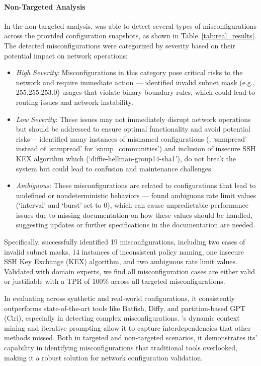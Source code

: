 \paragraph{Non-Targeted Analysis}
In the non-targeted analysis, \sysname{} was able to detect several types of misconfigurations across the provided configuration snapshots, as shown in Table~\ref{tab:real_results}.
The detected misconfigurations were categorized by severity based on their potential impact on network operations:
\begin{itemize}
    \item \textit{High Severity}: Misconfigurations in this category pose critical risks to the network and require immediate action --- \sysname{} identified invalid subnet mask (e.g., 255.255.253.0) usages that violate binary boundary rules, which could lead to routing issues and network instability.
    \item \textit{Low Severity}: These issues may not immediately disrupt network operations but should be addressed to ensure optimal functionality and avoid potential risks---
    \sysname{} identified many instances of misnamed configurations (\eg, `smnpread' instead of `snmpread' for `snmp\_communities') and inclusion of insecure SSH KEX algorithm which (`diffie-hellman-group14-sha1'), do not break the system but could lead to confusion and maintenance challenges.
    \item \textit{Ambiguous}: These misconfigurations are related to configurations that lead to undefined or nondeterministic behaviors --- \sysname{} found ambiguous rate limit values (`interval' and `burst' set to 0), which can cause unpredictable performance issues due to missing documentation on how these values should be handled, suggesting updates or further specifications in the documentation are needed.
\end{itemize}

Specifically, \sysname{} successfully identified 19 misconfigurations, including two cases of invalid subnet masks, 14 instances of inconsistent policy naming, one insecure SSH Key Exchange (KEX) algorithm, and two ambiguous rate limit values. Validated with domain experts, we find all misconfiguration cases are either valid or justifiable with a TPR of 100\% across all targeted misconfigurations.

In evaluating \sysname{} across synthetic and real-world configurations, it consistently outperforms state-of-the-art tools like Batfish, Diffy, and partition-based GPT (Ciri), especially in detecting complex misconfigurations. \sysname{}'s dynamic context mining and iterative prompting allow it to capture interdependencies that other methods missed. Both in targeted and non-targeted scenarios, it demonstrates its' capability in identifying misconfigurations that traditional tools overlooked, making it a robust solution for network configuration validation.